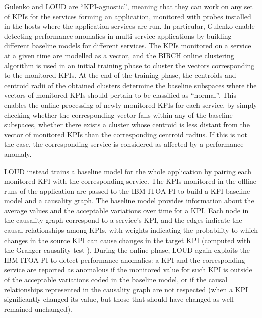 Gulenko \etal \cite{37_Gulenko2018_DetectingAnomalousBehaviourBlackBoxServices} and LOUD \cite{13_Mariani2018_LocalizingFaultsCloudSystems} are \enquote{KPI-agnostic}, meaning that they can work on any set of KPIs for the services forming an application, monitored with probes installed in the hosts where the application services are run.  
In particular, Gulenko \etal \cite{37_Gulenko2018_DetectingAnomalousBehaviourBlackBoxServices} enable detecting performance anomalies in multi-service applications by building different baseline models for different services.
The KPIs monitored on a service at a given time are modelled as a vector, and the BIRCH \cite{Zhang1996_BIRCH} online clustering algorithm is used in an initial training phase to cluster the vectors corresponding to the monitored KPIs.
At the end of the training phase, the centroids and centroid radii of the obtained clusters determine the baseline subspaces where the vectors of monitored KPIs should pertain to be classified as \enquote{normal}. 
This enables the online processing of newly monitored KPIs for each service, by simply checking whether the corresponding vector falls within any of the baseline subspaces, \viz whether there exists a cluster whose centroid is less distant from the vector of monitored KPIs than the corresponding centroid radius. 
If this is not the case, the corresponding service is considered as affected by a performance anomaly.

LOUD \cite{13_Mariani2018_LocalizingFaultsCloudSystems} instead trains a baseline model for the whole application by pairing each monitored KPI with the corresponding service.
The KPIs monitored in the offline runs of the application are passed to the IBM ITOA-PI \cite{IBM_ITOA_PI} to build a KPI baseline model and a causality graph.
The baseline model provides information about the average values and the acceptable variations over time for a KPI.
Each node in the causality graph correspond to a service's KPI, and the edges indicate the causal relationships among KPIs, with weights indicating the probability to which changes in the source KPI can cause changes in the target KPI (computed with the Granger causality test \cite{Arnold2007_GrangerMethodsTemporalCausalModelling}).
During the online phase, LOUD \cite{13_Mariani2018_LocalizingFaultsCloudSystems} again exploits the IBM ITOA-PI to detect performance anomalies: a KPI and the corresponding service are reported as anomalous if the monitored value for such KPI is outside of the acceptable variations coded in the baseline model, or if the causal relationships represented in the causality graph are not respected (\eg when a KPI significantly changed its value, but those that should have changed as well remained unchanged).

